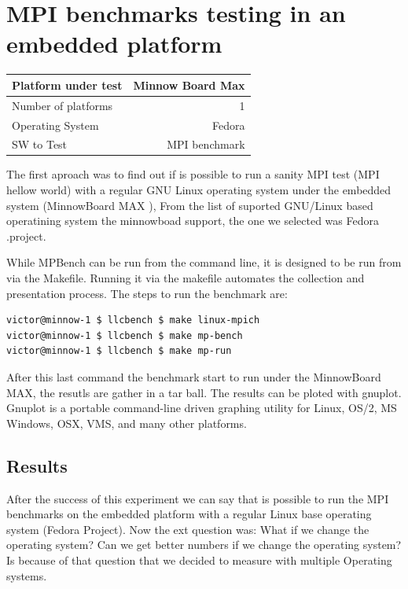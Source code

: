 \section{MPI benchmarks testing in an embedded platform}
    
    \begin{center}
    \begin{tabular}{ | l | r |}
        \hline
        Platform under test & Minnow Board  Max \\ \hline
        Number of platforms  & 1  \\ \hline
        Operating System & Fedora  \\ \hline
        SW to Test & MPI benchmark \\ \hline
    \end{tabular}
    \end{center}

The first aproach was to find out if is possible to run a sanity MPI test (MPI
hellow world) with a regular GNU Linux operating system under the embedded
system (MinnowBoard MAX \cite{minnowboard}),  From the list of suported GNU/Linux
based operatining system the minnowboad support, the one we selected was Fedora
\cite{fedora}.project. 


While MPBench can be run from the command line, it is designed to be run from
via the Makefile. Running it via the makefile automates the collection and
presentation process. The steps to run the benchmark are: 


\begin{lstlisting}[frame=single,language=bash]
victor@minnow-1 $ llcbench $ make linux-mpich
victor@minnow-1 $ llcbench $ make mp-bench
victor@minnow-1 $ llcbench $ make mp-run
\end{lstlisting}

After this last command the benchmark start to run under the MinnowBoard MAX, the
resutls are gather in a tar ball. The results can be ploted with gnuplot.
Gnuplot is a portable command-line driven graphing utility for Linux, OS/2, MS
Windows, OSX, VMS, and many other platforms. 

\subsection{Results}
After the success of this experiment we can say that is possible to run the MPI
benchmarks on the embedded platform with a regular Linux base operating system
(Fedora Project). Now the ext question was: What if we change the operating
system? Can we get better numbers if we change the operating system? Is because
of that question that we decided to measure with multiple Operating systems.


